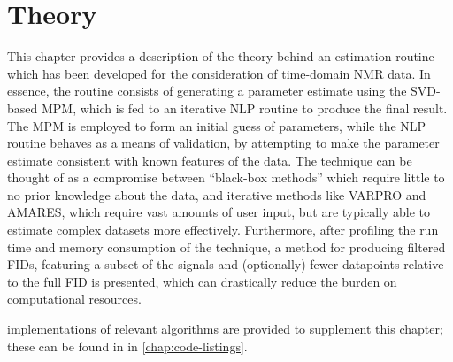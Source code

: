 \chapter{Theory}
\label{chap:theory}

This chapter provides a description of the theory behind an estimation
routine which has been developed for the consideration of time-domain \ac{NMR}
data.
In essence, the routine consists of generating a parameter estimate using the
\ac{SVD}-based \ac{MPM}, which is fed to an iterative \ac{NLP} routine to
produce the final result. The \ac{MPM} is employed to form an initial
guess of parameters, while the \ac{NLP} routine behaves as a means of validation,
by attempting to make the parameter estimate consistent with
known features of the data. The technique can be thought of as a compromise
between ``black-box methods''\cite{Poullet2008} which require little to no
prior knowledge about the data, and iterative methods like \ac{VARPRO} and
\ac{AMARES}, which require vast amounts of user input, but are typically
able to estimate complex datasets more effectively.
Furthermore, after profiling the run time and memory consumption of the
technique, a method for producing filtered \acp{FID}, featuring a subset of the
signals and (optionally) fewer datapoints relative to the full \ac{FID} is
presented, which can drastically reduce the burden on computational resources.

\Python implementations of relevant algorithms are provided to supplement this
chapter; these can be found in in \cref{chap:code-listings}.







